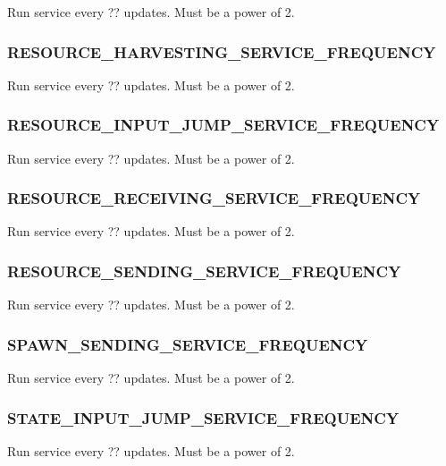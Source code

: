 
Run service every ?? updates.
Must be a power of 2.

\subsubsection{RESOURCE\_HARVESTING\_SERVICE\_FREQUENCY}


Run service every ?? updates.
Must be a power of 2.

\subsubsection{RESOURCE\_INPUT\_JUMP\_SERVICE\_FREQUENCY}


Run service every ?? updates.
Must be a power of 2.

\subsubsection{RESOURCE\_RECEIVING\_SERVICE\_FREQUENCY}


Run service every ?? updates.
Must be a power of 2.

\subsubsection{RESOURCE\_SENDING\_SERVICE\_FREQUENCY}


Run service every ?? updates.
Must be a power of 2.

\subsubsection{SPAWN\_SENDING\_SERVICE\_FREQUENCY}


Run service every ?? updates.
Must be a power of 2.

\subsubsection{STATE\_INPUT\_JUMP\_SERVICE\_FREQUENCY}


Run service every ?? updates.
Must be a power of 2.

